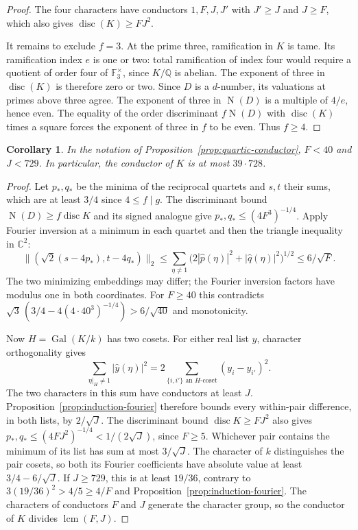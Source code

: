 \documentclass[11pt,a4paper]{article}
\newtheorem{corollary}[theorem]{Corollary}
\numberwithin{equation}{section}
\begin{document}
\begin{proof}
The four characters have conductors $1,F,J,J'$ with $J'\ge J$ and $J\ge F$, which also gives $\operatorname{disc}(K)\ge FJ^2$.

It remains to exclude $f=3$. At the prime three, ramification in $K$ is tame. Its ramification index $e$ is one or two: total ramification of index four would require a quotient of order four of $\mathbb F_3^\times$, since $K/\mathbb Q$ is abelian. The exponent of three in $\operatorname{disc}(K)$ is therefore zero or two. Since $D$ is a $d$-number, its valuations at primes above three agree. The exponent of three in $\operatorname{N}(D)$ is a multiple of $4/e$, hence even. The equality of the order discriminant $f\operatorname{N}(D)$ with $\operatorname{disc}(K)$ times a square forces the exponent of three in $f$ to be even. Thus $f\ge4$.
\end{proof}



\begin{corollary}\label{cor:quartic-effective-conductor}
In the notation of Proposition~\ref{prop:quartic-conductor}, $F<40$ and
$J<729$. In particular, the conductor of $K$ is at most $39\cdot 728$.
\end{corollary}
\begin{proof}
Let $p_* ,q_*$ be the minima of the reciprocal quartets and $s,t$ their
sums, which are at least $3/4$ since $4\le f\mid g$. The discriminant
bound $\operatorname{N}(D)\ge f\operatorname{disc}K$ and its signed
analogue give $p_*,q_*\le (4F^3)^{-1/4}$. Apply Fourier inversion at a
minimum in each quartet and then the triangle inequality in $\mathbb C^2$:
\[
 \big\|(\sqrt2(s-4p_*),t-4q_*)\big\|_2
 \le \sum_{\eta\ne1}
      \big(2|\widehat p(\eta)|^2+|\widehat q(\eta)|^2\big)^{1/2}
 \le 6/\sqrt F .
\]
The two minimizing embeddings may differ; the Fourier inversion factors
have modulus one in both coordinates. For $F\ge40$ this contradicts
$\sqrt3\,(3/4-4(4\cdot40^3)^{-1/4})>6/\sqrt{40}$ and monotonicity.

Now $H=\operatorname{Gal}(K/k)$ has two cosets. For either real list
$y$, character orthogonality gives
\[
 \sum_{\eta|_H\ne1}|\widehat y(\eta)|^2
   =2\sum_{\{i,i'\}\text{ an }H\text{-coset}}(y_i-y_{i'})^2.
\]
The two characters in this sum have conductors at least $J$.
Proposition~\ref{prop:induction-fourier} therefore bounds every
within-pair difference, in both lists, by $2/\sqrt J$.
The discriminant bound $\operatorname{disc}K\ge FJ^2$ also gives
$p_*,q_*\le(4FJ^2)^{-1/4}<1/(2\sqrt J)$, since $F\ge5$.
Whichever pair contains the minimum of its list has sum at most
$3/\sqrt J$. The character of $k$ distinguishes the pair cosets, so
both its Fourier coefficients have absolute value at least
$3/4-6/\sqrt J$. If $J\ge729$, this is at least $19/36$, contrary to
$3(19/36)^2>4/5\ge4/F$ and Proposition~\ref{prop:induction-fourier}.
The characters of conductors $F$ and $J$ generate the character group,
so the conductor of $K$ divides $\operatorname{lcm}(F,J)$.
\end{proof}
\end{document}
